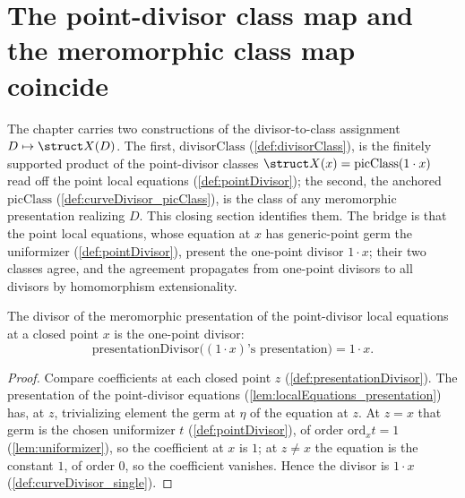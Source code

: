 \section{The point-divisor class map and the meromorphic class map coincide}

The chapter carries two constructions of the divisor-to-class assignment \(D \mapsto \struct
X(D)\). The first, \(\mathrm{divisorClass}\) (\ref{def:divisorClass}), is the finitely supported
product of the point-divisor classes \(\struct X(x) = \mathrm{picClass}(1 \cdot x)\) read off the
point local equations (\ref{def:pointDivisor}); the second, the anchored
\(\mathrm{picClass}\) (\ref{def:curveDivisor_picClass}), is the class of any meromorphic
presentation realizing \(D\). This closing section identifies them. The bridge is that the point
local equations, whose equation at \(x\) has generic-point germ the uniformizer
(\ref{def:pointDivisor}), present the one-point divisor \(1 \cdot x\); their two classes agree, and
the agreement propagates from one-point divisors to all divisors by homomorphism extensionality.

\begin{theorem}
  \label{thm:presentationDivisor_pointDivisor}
  \leanok
  The divisor of the meromorphic presentation of the point-divisor local equations at a closed
  point \(x\) is the one-point divisor:
  \[
    \mathrm{presentationDivisor}\bigl((1 \cdot x)\text{'s presentation}\bigr) = 1 \cdot x .
  \]
\end{theorem}
\begin{proof}
  \leanok
  Compare coefficients at each closed point \(z\) (\ref{def:presentationDivisor}). The presentation
  of the point-divisor equations (\ref{lem:localEquations_presentation}) has, at \(z\), trivializing
  element the germ at \(\eta\) of the equation at \(z\). At \(z = x\) that germ is the chosen
  uniformizer \(t\) (\ref{def:pointDivisor}), of order \(\mathrm{ord}_x t = 1\)
  (\ref{lem:uniformizer}), so the coefficient at \(x\) is \(1\); at \(z \neq x\) the equation is the
  constant \(1\), of order \(0\), so the coefficient vanishes. Hence the divisor is \(1 \cdot x\)
  (\ref{def:curveDivisor_single}).
\end{proof}

